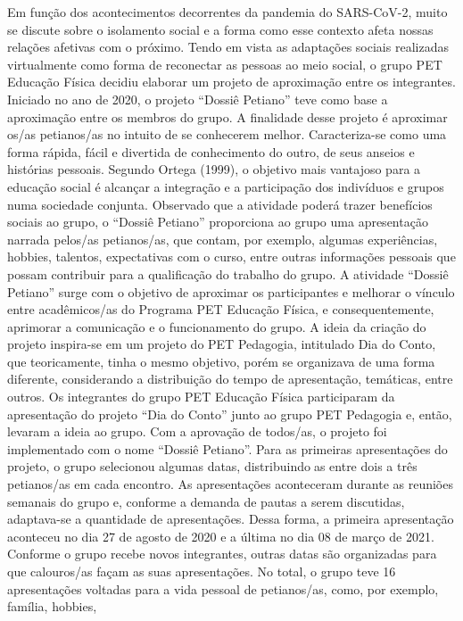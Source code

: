 Em função dos acontecimentos decorrentes da pandemia do SARS-CoV-2, muito se 
discute sobre o isolamento social e a forma como esse contexto afeta nossas relações afetivas com 
o próximo. Tendo em vista as adaptações sociais realizadas virtualmente como forma de reconectar 
as pessoas ao meio social, o grupo PET Educação Física decidiu elaborar um projeto de 
aproximação entre os integrantes. Iniciado no ano de 2020, o projeto “Dossiê Petiano” teve como 
base a aproximação entre os membros do grupo.
A finalidade desse projeto é aproximar os/as petianos/as no intuito de se conhecerem 
melhor. Caracteriza-se como uma forma rápida, fácil e divertida de conhecimento do outro, de
seus anseios e histórias pessoais. Segundo Ortega (1999), o objetivo mais vantajoso para a 
educação social é alcançar a integração e a participação dos indivíduos e grupos numa sociedade 
conjunta. Observado que a atividade poderá trazer benefícios sociais ao grupo, o “Dossiê Petiano” 
proporciona ao grupo uma apresentação narrada pelos/as petianos/as, que contam, por exemplo, 
algumas experiências, hobbies, talentos, expectativas com o curso, entre outras informações 
pessoais que possam contribuir para a qualificação do trabalho do grupo.
A atividade “Dossiê Petiano” surge com o objetivo de aproximar os participantes e 
melhorar o vínculo entre acadêmicos/as do Programa PET Educação Física, e consequentemente, 
aprimorar a comunicação e o funcionamento do grupo. A ideia da criação do projeto inspira-se 
em um projeto do PET Pedagogia, intitulado Dia do Conto, que teoricamente, tinha o mesmo 
objetivo, porém se organizava de uma forma diferente, considerando a distribuição do tempo de 
apresentação, temáticas, entre outros. Os integrantes do grupo PET Educação Física participaram 
da apresentação do projeto “Dia do Conto” junto ao grupo PET Pedagogia e, então, levaram a ideia 
ao grupo. Com a aprovação de todos/as, o projeto foi implementado com o nome “Dossiê Petiano”.
Para as primeiras apresentações do projeto, o grupo selecionou algumas datas, distribuindoas entre dois a três petianos/as em cada encontro. As apresentações aconteceram durante as 
reuniões semanais do grupo e, conforme a demanda de pautas a serem discutidas, adaptava-se a 
quantidade de apresentações. Dessa forma, a primeira apresentação aconteceu no dia 27 de agosto 
de 2020 e a última no dia 08 de março de 2021. Conforme o grupo recebe novos integrantes, outras 
datas são organizadas para que calouros/as façam as suas apresentações. No total, o grupo teve 16 
apresentações voltadas para a vida pessoal de petianos/as, como, por exemplo, família, hobbies, 
